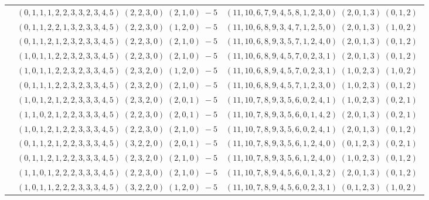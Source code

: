 \documentclass[11pt]{article}
\begin{document}
\begin{longtable}[l]{|c|c|c|}
 \cline{2-3} 
 & $(0 ,1 ,1 ,1 ,2 ,2 ,3 ,3 ,2 ,3 ,4 ,5) \;(2 ,2 ,3 ,0) \;(2 ,1 ,0) \;-5$ & $(11 ,10 ,6 ,7 ,9 ,4 ,5 ,8 ,1 ,2 ,3 ,0) \;(2 ,0 ,1 ,3) \;(0 ,1 ,2) \;$\\ 
 \cline{2-3} 
 & $(0 ,1 ,1 ,2 ,2 ,1 ,3 ,2 ,3 ,3 ,4 ,5) \;(2 ,2 ,3 ,0) \;(1 ,2 ,0) \;-5$ & $(11 ,10 ,6 ,8 ,9 ,3 ,4 ,7 ,1 ,2 ,5 ,0) \;(2 ,0 ,1 ,3) \;(1 ,0 ,2) \;$\\ 
 \cline{2-3} 
 & $(0 ,1 ,1 ,2 ,1 ,2 ,3 ,2 ,3 ,3 ,4 ,5) \;(2 ,2 ,3 ,0) \;(2 ,1 ,0) \;-5$ & $(11 ,10 ,6 ,8 ,9 ,3 ,5 ,7 ,1 ,2 ,4 ,0) \;(2 ,0 ,1 ,3) \;(0 ,1 ,2) \;$\\ 
 \cline{2-3} 
 & $(1 ,0 ,1 ,1 ,2 ,2 ,3 ,2 ,3 ,3 ,4 ,5) \;(2 ,2 ,3 ,0) \;(2 ,1 ,0) \;-5$ & $(11 ,10 ,6 ,8 ,9 ,4 ,5 ,7 ,0 ,2 ,3 ,1) \;(2 ,0 ,1 ,3) \;(0 ,1 ,2) \;$\\ 
 \cline{2-3} 
 & $(1 ,0 ,1 ,1 ,2 ,2 ,3 ,2 ,3 ,3 ,4 ,5) \;(2 ,3 ,2 ,0) \;(1 ,2 ,0) \;-5$ & $(11 ,10 ,6 ,8 ,9 ,4 ,5 ,7 ,0 ,2 ,3 ,1) \;(1 ,0 ,2 ,3) \;(1 ,0 ,2) \;$\\ 
 \cline{2-3} 
 & $(0 ,1 ,1 ,1 ,2 ,2 ,3 ,2 ,3 ,3 ,4 ,5) \;(2 ,3 ,2 ,0) \;(2 ,1 ,0) \;-5$ & $(11 ,10 ,6 ,8 ,9 ,4 ,5 ,7 ,1 ,2 ,3 ,0) \;(1 ,0 ,2 ,3) \;(0 ,1 ,2) \;$\\ 
 \cline{2-3} 
 & $(1 ,0 ,1 ,2 ,1 ,2 ,2 ,3 ,3 ,3 ,4 ,5) \;(2 ,3 ,2 ,0) \;(2 ,0 ,1) \;-5$ & $(11 ,10 ,7 ,8 ,9 ,3 ,5 ,6 ,0 ,2 ,4 ,1) \;(1 ,0 ,2 ,3) \;(0 ,2 ,1) \;$\\ 
 \cline{2-3} 
 & $(1 ,1 ,0 ,2 ,1 ,2 ,2 ,3 ,3 ,3 ,4 ,5) \;(2 ,2 ,3 ,0) \;(2 ,0 ,1) \;-5$ & $(11 ,10 ,7 ,8 ,9 ,3 ,5 ,6 ,0 ,1 ,4 ,2) \;(2 ,0 ,1 ,3) \;(0 ,2 ,1) \;$\\ 
 \cline{2-3} 
 & $(1 ,0 ,1 ,2 ,1 ,2 ,2 ,3 ,3 ,3 ,4 ,5) \;(2 ,2 ,3 ,0) \;(2 ,1 ,0) \;-5$ & $(11 ,10 ,7 ,8 ,9 ,3 ,5 ,6 ,0 ,2 ,4 ,1) \;(2 ,0 ,1 ,3) \;(0 ,1 ,2) \;$\\ 
 \cline{2-3} 
 & $(0 ,1 ,1 ,2 ,1 ,2 ,2 ,3 ,3 ,3 ,4 ,5) \;(3 ,2 ,2 ,0) \;(2 ,0 ,1) \;-5$ & $(11 ,10 ,7 ,8 ,9 ,3 ,5 ,6 ,1 ,2 ,4 ,0) \;(0 ,1 ,2 ,3) \;(0 ,2 ,1) \;$\\ 
 \cline{2-3} 
 & $(0 ,1 ,1 ,2 ,1 ,2 ,2 ,3 ,3 ,3 ,4 ,5) \;(2 ,3 ,2 ,0) \;(2 ,1 ,0) \;-5$ & $(11 ,10 ,7 ,8 ,9 ,3 ,5 ,6 ,1 ,2 ,4 ,0) \;(1 ,0 ,2 ,3) \;(0 ,1 ,2) \;$\\ 
 \cline{2-3} 
 & $(1 ,1 ,0 ,1 ,2 ,2 ,2 ,3 ,3 ,3 ,4 ,5) \;(2 ,2 ,3 ,0) \;(2 ,1 ,0) \;-5$ & $(11 ,10 ,7 ,8 ,9 ,4 ,5 ,6 ,0 ,1 ,3 ,2) \;(2 ,0 ,1 ,3) \;(0 ,1 ,2) \;$\\ 
 \cline{2-3} 
 & $(1 ,0 ,1 ,1 ,2 ,2 ,2 ,3 ,3 ,3 ,4 ,5) \;(3 ,2 ,2 ,0) \;(1 ,2 ,0) \;-5$ & $(11 ,10 ,7 ,8 ,9 ,4 ,5 ,6 ,0 ,2 ,3 ,1) \;(0 ,1 ,2 ,3) \;(1 ,0 ,2) \;$\\ 

\end{longtable}
\end{document}
